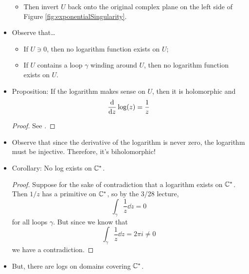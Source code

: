 \documentclass[../notes.tex]{subfiles}
\begin{document}
\begin{itemize}
\begin{itemize}
        \item Then invert $U$ back onto the original complex plane on the left side of Figure \ref{fig:exponentialSingularity}.
    \end{itemize}
    \pagebreak
    \item Observe that\dots
    \begin{itemize}
        \item If $U\ni 0$, then no logarithm function exists on $U$;
        \item If $U$ contains a loop $\gamma$ winding around $U$, then no logarithm function exists on $U$.
    \end{itemize}
    \item Proposition: If the logarithm makes sense on $U$, then it is holomorphic and
    \begin{equation*}
        \dv{z}\log(z) = \frac{1}{z}
    \end{equation*}
    \begin{proof}
        See \textcite{bib:FischerLieb}.
    \end{proof}
    \item Observe that since the derivative of the logarithm is never zero, the logarithm must be injective. Therefore, it's biholomorphic!
    \item Corollary: No log exists on $\mathbb{C}^*$.
    \begin{proof}
        Suppose for the sake of contradiction that a logarithm exists on $\mathbb{C}^*$. Then $1/z$ has a primitive on $\mathbb{C}^*$, so by the 3/28 lecture,
        \begin{equation*}
            \int_\gamma\frac{1}{z}\dd{z} = 0
        \end{equation*}
        for all loops $\gamma$. But since we know that
        \begin{equation*}
            \int_\gamma\frac{1}{z}\dd{z} = 2\pi i \neq 0
        \end{equation*}
        we have a contradiction.
    \end{proof}
    \item But, there are logs on domains covering $\mathbb{C}^*$.
    \begin{figure}[h!]
        \centering
\end{figure}
\end{itemize}
\end{document}
